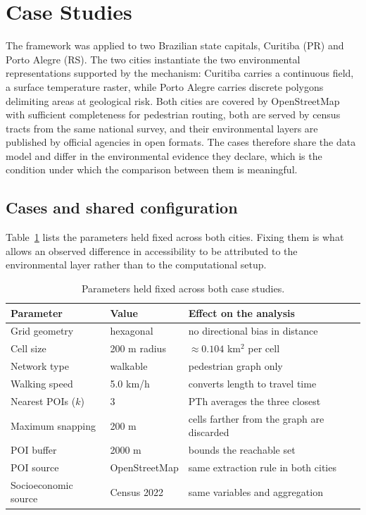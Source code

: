 \section{Case Studies}
\label{sec:case_studies}

The framework was applied to two Brazilian state capitals, Curitiba (PR) and Porto Alegre (RS). The two cities instantiate the two environmental representations supported by the mechanism: Curitiba carries a continuous field, a surface temperature raster, while Porto Alegre carries discrete polygons delimiting areas at geological risk. Both cities are covered by OpenStreetMap with sufficient completeness for pedestrian routing, both are served by census tracts from the same national survey, and their environmental layers are published by official agencies in open formats. The cases therefore share the data model and differ in the environmental evidence they declare, which is the condition under which the comparison between them is meaningful.

\subsection{Cases and shared configuration}
\label{subsec:shared-config}

Table~\ref{tab:shared-config} lists the parameters held fixed across both cities. Fixing them is what allows an observed difference in accessibility to be attributed to the environmental layer rather than to the computational setup.

\begin{table}[htbp]
\centering
\caption{Parameters held fixed across both case studies.}
\label{tab:shared-config}
\begin{tabular}{lll}
\hline
Parameter & Value & Effect on the analysis \\
\hline
Grid geometry & hexagonal & no directional bias in distance \\
Cell size & 200 m radius & $\approx 0.104$ km$^2$ per cell \\
Network type & walkable & pedestrian graph only \\
Walking speed & 5.0 km/h & converts length to travel time \\
Nearest POIs ($k$) & 3 & PTh averages the three closest \\
Maximum snapping & 200 m & cells farther from the graph are discarded \\
POI buffer & 2000 m & bounds the reachable set \\
POI source & OpenStreetMap & same extraction rule in both cities \\
Socioeconomic source & Census 2022 & same variables and aggregation \\
\hline
\end{tabular}
\end{table}

